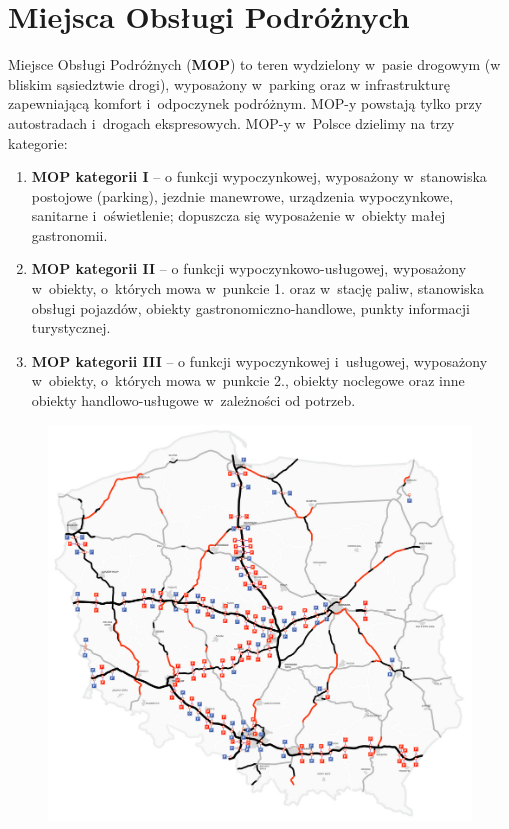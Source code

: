 \section{Miejsca Obsługi Podróżnych}
Miejsce Obsługi Podróżnych (\textbf{MOP}) to teren wydzielony w~pasie drogowym (w bliskim sąsiedztwie drogi), wyposażony w~parking oraz w infrastrukturę zapewniającą komfort i~odpoczynek podróżnym\cite{gddkia-mop}. MOP-y powstają tylko przy autostradach i~drogach ekspresowych.\newline
MOP-y w~Polsce dzielimy na trzy kategorie:
\begin{enumerate}
    \item \textbf{MOP kategorii I} -- o funkcji wypoczynkowej, wyposażony w~stanowiska postojowe (parking), jezdnie manewrowe, urządzenia wypoczynkowe, sanitarne i~oświetlenie; dopuszcza się wyposażenie w~obiekty małej gastronomii.
    \item \textbf{MOP kategorii II} -- o funkcji wypoczynkowo-usługowej, wyposażony w~obiekty, o~których mowa w~punkcie 1. oraz w~stację paliw, stanowiska obsługi pojazdów, obiekty gastronomiczno-handlowe, punkty informacji turystycznej.
    \item \textbf{MOP kategorii III} -- o funkcji wypoczynkowej i~usługowej, wyposażony w~obiekty, o~których mowa w~punkcie 2., obiekty noclegowe oraz inne obiekty handlowo-usługowe w~zależności od potrzeb.
\end{enumerate}
\begin{figure}[h]
\includegraphics[width=\textwidth]{images/mopymap.png}
\end{figure}

